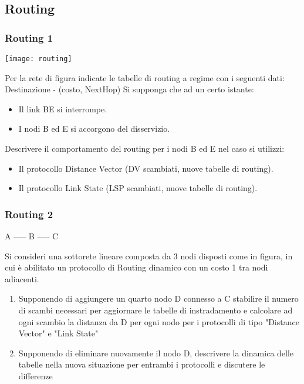     \subsection{Routing}
        \subsubsection{Routing 1}
            \problem
            \centerline{\texttt{[image: routing]}}

            Per la rete di figura indicate le tabelle di routing a regime con i seguenti dati:
            Destinazione - (costo, NextHop)
            Si supponga che ad un certo istante:
            \begin{itemize}
                \item Il link BE si interrompe.
                \item I nodi B ed E si accorgono del disservizio.
            \end{itemize}

            Descrivere il comportamento del routing per i nodi B ed E nel caso si utilizzi:
            \begin{itemize}
                \item Il protocollo Distance Vector (DV scambiati, nuove tabelle di routing).
                \item Il protocollo Link State (LSP scambiati, nuove tabelle di routing).
            \end{itemize}

        \subsubsection{Routing 2}
            \problem
            \centerline{A ----- B ----- C}
            
            Si consideri una sottorete lineare composta da 3 nodi disposti come in figura, in cui è abilitato un protocollo di Routing dinamico con un costo 1 tra nodi adiacenti.
            \begin{enumerate}
                \item Supponendo di aggiungere un quarto nodo D connesso a C stabilire il numero di
                scambi necessari per aggiornare le tabelle di instradamento e calcolare ad ogni
                scambio la distanza da D per ogni nodo per i protocolli di tipo "Distance Vector" e
                "Link State"
                \item Supponendo di eliminare nuovamente il nodo D, descrivere la dinamica delle
                tabelle nella nuova situazione per entrambi i protocolli e discutere le differenze
            \end{enumerate}